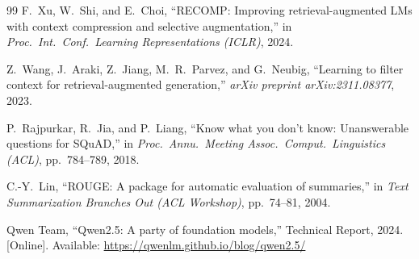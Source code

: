 \documentclass[conference]{IEEEtran}
\begin{document}
\begin{thebibliography}{99}
F.~Xu, W.~Shi, and E.~Choi, ``RECOMP: Improving retrieval-augmented LMs with context compression and selective augmentation,'' in \emph{Proc.\ Int.\ Conf.\ Learning Representations (ICLR)}, 2024.

Z.~Wang, J.~Araki, Z.~Jiang, M.~R.~Parvez, and G.~Neubig, ``Learning to filter context for retrieval-augmented generation,'' \emph{arXiv preprint arXiv:2311.08377}, 2023.

P.~Rajpurkar, R.~Jia, and P.~Liang, ``Know what you don't know: Unanswerable questions for SQuAD,'' in \emph{Proc.\ Annu.\ Meeting Assoc.\ Comput.\ Linguistics (ACL)}, pp.~784--789, 2018.

C.-Y.~Lin, ``ROUGE: A package for automatic evaluation of summaries,'' in \emph{Text Summarization Branches Out (ACL Workshop)}, pp.~74--81, 2004.

Qwen Team, ``Qwen2.5: A party of foundation models,'' Technical Report, 2024. [Online]. Available: \url{https://qwenlm.github.io/blog/qwen2.5/}

\end{thebibliography}
\end{document}
